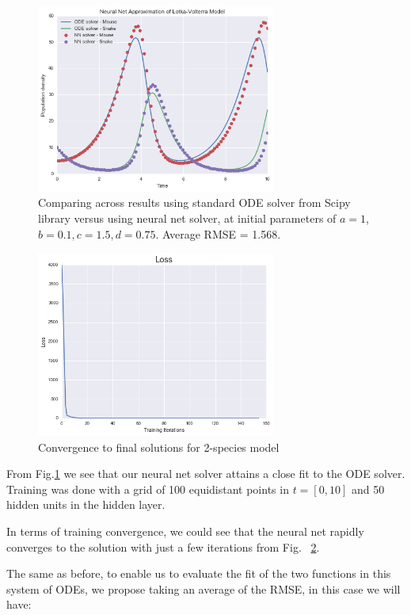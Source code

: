 \documentclass[11pt]{article}
\begin{document}
\begin{figure}
\centering
\includegraphics[width=0.7\textwidth]{LV_compare.png}
      \caption{Comparing across results using standard ODE solver from Scipy library versus using neural net solver, at initial parameters of $a = 1$, $b = 0.1, c = 1.5, d = 0.75$. Average RMSE = 1.568. \label{fig:LVFig}}
\end{figure}

\begin{figure}
\centering
\includegraphics[width=0.7\textwidth]{loss_LV2.png}
      \caption{Convergence to final solutions for 2-species model \label{fig:loss_LV2}}
\end{figure}

From Fig.\ref{fig:LVFig} we see that our neural net solver attains a close fit to the ODE solver. Training was done with a grid of 100 equidistant points in $t = [0, 10]$ and 50 hidden units in the hidden layer. 

In terms of training convergence, we could see that the neural net rapidly converges to the solution with just a few iterations from Fig. ~\ref{fig:loss_LV2}.


The same as before, to enable us to evaluate the fit of the two functions in this system of ODEs, we propose taking an average of the RMSE, in this case we will have:
\end{document}
